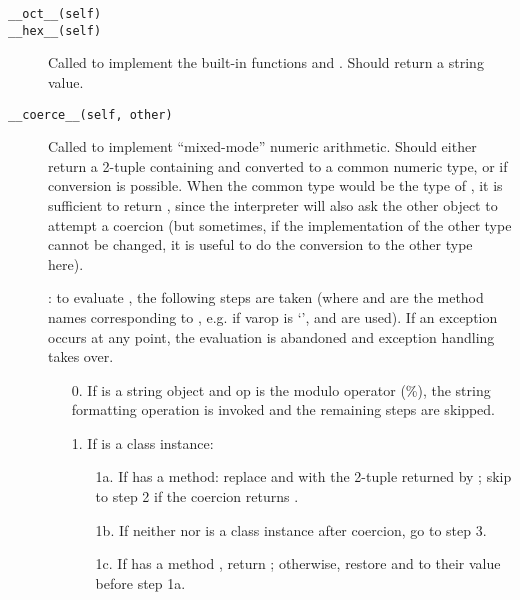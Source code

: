 \begin{description}
\item[{\tt __oct__(self)}]\itemjoin
\item[{\tt __hex__(self)}]\itembreak
Called to implement the built-in functions  and
.  Should return a string value.

\item[{\tt __coerce__(self, other)}]
Called to implement ``mixed-mode'' numeric arithmetic.  Should either
return a 2-tuple containing  and  converted to
a common numeric type, or  if conversion is possible.  When
the common type would be the type of , it is sufficient to
return , since the interpreter will also ask the other
object to attempt a coercion (but sometimes, if the implementation of
the other type cannot be changed, it is useful to do the conversion to
the other type here).

: to evaluate   , the
following steps are taken (where  and
 are the method names corresponding to ,
e.g. if var{op} is `\code{+}',  and
 are used).  If an exception occurs at any point,
the evaluation is abandoned and exception handling takes over.

\begin{itemize}

\item[0.] If  is a string object and op is the modulo operator (\%),
the string formatting operation is invoked and the remaining steps are
skipped.

\item[1.] If  is a class instance:

	\begin{itemize}

	\item[1a.] If  has a  method:
	replace  and  with the 2-tuple returned by
	; skip to step 2 if the
	coercion returns .

	\item[1b.] If neither  nor  is a class instance
	after coercion, go to step 3.

	\item[1c.] If  has a method , return
	; otherwise, restore  and
	 to their value before step 1a.


\end{itemize}
\end{itemize}
\end{description}
